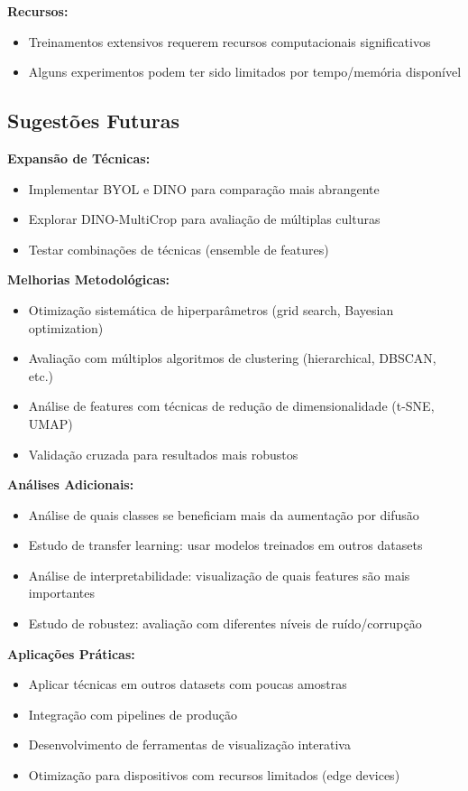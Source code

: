 \textbf{Recursos:}
\begin{itemize}
    \item Treinamentos extensivos requerem recursos computacionais significativos
    \item Alguns experimentos podem ter sido limitados por tempo/memória disponível
\end{itemize}

\subsection{Sugestões Futuras}

\textbf{Expansão de Técnicas:}
\begin{itemize}
    \item Implementar BYOL e DINO para comparação mais abrangente
    \item Explorar DINO-MultiCrop para avaliação de múltiplas culturas
    \item Testar combinações de técnicas (ensemble de features)
\end{itemize}

\textbf{Melhorias Metodológicas:}
\begin{itemize}
    \item Otimização sistemática de hiperparâmetros (grid search, Bayesian optimization)
    \item Avaliação com múltiplos algoritmos de clustering (hierarchical, DBSCAN, etc.)
    \item Análise de features com técnicas de redução de dimensionalidade (t-SNE, UMAP)
    \item Validação cruzada para resultados mais robustos
\end{itemize}

\textbf{Análises Adicionais:}
\begin{itemize}
    \item Análise de quais classes se beneficiam mais da aumentação por difusão
    \item Estudo de transfer learning: usar modelos treinados em outros datasets
    \item Análise de interpretabilidade: visualização de quais features são mais importantes
    \item Estudo de robustez: avaliação com diferentes níveis de ruído/corrupção
\end{itemize}

\textbf{Aplicações Práticas:}
\begin{itemize}
    \item Aplicar técnicas em outros datasets com poucas amostras
    \item Integração com pipelines de produção
    \item Desenvolvimento de ferramentas de visualização interativa
    \item Otimização para dispositivos com recursos limitados (edge devices)
\end{itemize}

